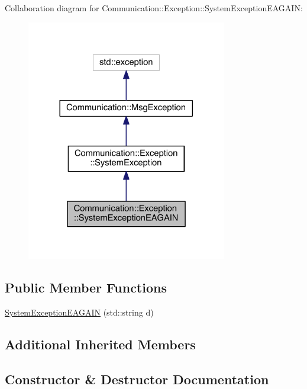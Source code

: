 Collaboration diagram for Communication\+:\+:Exception\+:\+:System\+Exception\+E\+A\+G\+A\+I\+N\+:\nopagebreak
\begin{figure}[H]
\begin{center}
\leavevmode
\includegraphics[width=248pt]{class_communication_1_1_exception_1_1_system_exception_e_a_g_a_i_n__coll__graph}
\end{center}
\end{figure}
\subsection*{Public Member Functions}
\begin{DoxyCompactItemize}
\item 
\hyperlink{class_communication_1_1_exception_1_1_system_exception_e_a_g_a_i_n_aea693ba606427c008b59b3c05b94e129}{System\+Exception\+E\+A\+G\+A\+I\+N} (std\+::string d)
\end{DoxyCompactItemize}
\subsection*{Additional Inherited Members}


\subsection{Constructor \& Destructor Documentation}
\hypertarget{class_communication_1_1_exception_1_1_system_exception_e_a_g_a_i_n_aea693ba606427c008b59b3c05b94e129}{}
